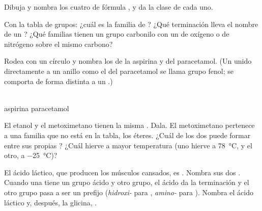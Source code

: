 \begin{exercise}[$\star\star$]\label{exo:g11:functional-groups:10}
Dibuja y nombra los cuatro  de fórmula , y da la
clase de cada uno.
\end{exercise}

\begin{exercise}[$\star\star$]\label{exo:g11:functional-groups:11}
Con la tabla de grupos: ¿cuál es la familia de ? ¿Qué
terminación lleva el nombre de un ? ¿Qué familias tienen un
grupo carbonilo con un  de oxígeno o de nitrógeno sobre el mismo
carbono?
\end{exercise}

\begin{exercise}[$\star\star\star$]\label{exo:g11:functional-groups:12}
Rodea con un círculo y nombra los  de la aspirina y del
paracetamol. (Un  unido directamente a un anillo como el del
paracetamol se llama grupo fenol; se comporta de forma distinta a un
.)
\begin{center}
\qquad
{}
\\[2pt] \small aspirina \hspace{4.2cm} paracetamol
\end{center}
\end{exercise}

\begin{exercise}[$\star\star\star$]\label{exo:g11:functional-groups:13}
El etanol  y el metoximetano  tienen la
misma . Dala. El metoximetano pertenece a una familia
que no está en la tabla, los éteres. ¿Cuál de los dos puede formar
 entre sus propias ? ¿Cuál hierve a mayor
temperatura (uno hierve a \qty{78}{\celsius}, y el otro, a
\qty{-25}{\celsius})?
\end{exercise}

\begin{exercise}[$\star\star\star$]\label{exo:g11:functional-groups:14}
El ácido láctico, que producen los músculos cansados, es
. Nombra sus dos .
Cuando una  tiene un grupo ácido y otro grupo, el ácido da la
terminación y el otro grupo pasa a ser un prefijo (\emph{hidroxi-} para
, \emph{amino-} para ). Nombra el ácido láctico y,
después, la glicina, .
\end{exercise}

